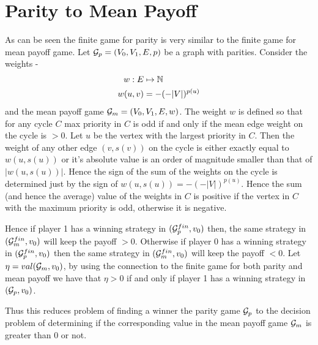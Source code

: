 \section{Parity to Mean Payoff}
As can be seen the finite game for parity is very similar to the finite game for mean payoff game. Let $\mathcal{G}_p=(V_0,V_1,E,p)$ be a graph with parities. Consider the weights -
\begin{align}
    w : E &\mapsto \mathbb{N} \\
    w(u,v) &= -(-|V|)^{p(u)}
\end{align}
and the mean payoff game $\mathcal{G}_m=(V_0,V_1,E,w)$. The weight $w$ is defined so that for any cycle $C$ max priority in $C$ is odd  if and only if the mean edge weight on the cycle is $> 0$. Let $u$ be the vertex with the largest priority in $C$. Then the weight of any other edge $(v,s(v))$ on the cycle is either exactly equal to $w(u,s(u))$ or it's absolute value is an order of magnitude smaller than that of $|w(u,s(u))|$. Hence the sign of the sum of the weights on the cycle is determined just by the sign of $w(u,s(u))=-(-|V|)^{p(u)}$. Hence the sum (and hence the average) value of the weights in $C$ is positive if the vertex in $C$ with the maximum priority is odd, otherwise it is negative.

Hence if player 1 has a winning strategy in $(\mathcal{G}_p^{fin},v_0)$ then, the same strategy in $(\mathcal{G}_m^{fin},v_0)$ will keep the payoff $>0$. Otherwise if player 0 has a winning strategy in $(\mathcal{G}_p^{fin},v_0)$ then the same strategy in $(\mathcal{G}_m^{fin},v_0)$ will keep the payoff $<0$. Let $\eta=val(\mathcal{G}_m,v_0)$, by using the connection to the finite game for both parity and mean payoff we have that $\eta > 0$ if and only if player 1 has a winning strategy in $(\mathcal{G}_p,v_0)$.

Thus this reduces problem of finding a winner the parity game $\mathcal{G}_p$ to the decision problem of determining if the corresponding value in the mean payoff game $\mathcal{G}_m$ is greater than 0 or not.

